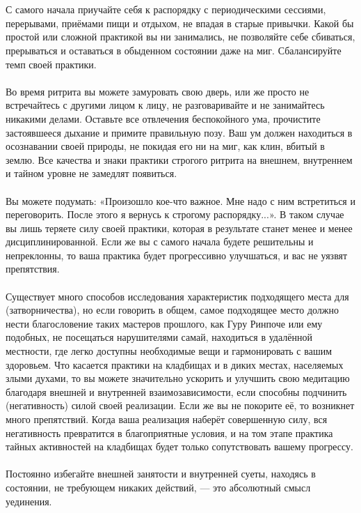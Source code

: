 \\ \\ С самого начала приучайте себя к распорядку с периодически\-ми сессиями, перерывами, приёмами пищи и отдыхом, не впадая в старые привычки. Какой бы простой или сложной практикой вы ни занимались, не позволяйте себе сбиваться, прерываться и оставаться в обыденном состоянии даже на миг. Сбалансируйте темп своей практики.
\\ \\ Во время ритрита вы можете замуровать свою дверь, или же просто не встречайтесь с другими лицом к лицу, не разговаривайте и не занимайтесь никакими делами. Оставьте все отвлечения беспокойного ума, прочистите застоявшееся дыхание и примите правильную позу. Ваш ум должен находиться в осознавании своей природы, не покидая его ни на миг, как клин, вбитый в землю. Все качества и знаки практики строгого ритрита на внешнем, внутреннем и тайном уровне не замедлят появиться.
\\ \\ Вы можете подумать: «Произошло кое-что важное. Мне надо с ним встретиться и переговорить. После этого я вернусь к строгому распорядку...». В таком случае вы лишь теряете силу своей практики, которая в результате станет менее и менее дисциплинированной. Если же вы с самого начала будете решительны и непреклонны, то ваша практика будет прогрессивно улучшаться, и вас не уязвят препятствия.
\\ \\ Существует много способов исследования характеристик подходящего места для (затворничества), но если говорить в общем, самое подходящее место должно нести благословение таких мастеров прошлого, как Гуру Ринпоче или ему подобных, не посещаться нарушителями самай, находиться в удалённой местности, где легко доступны необходимые вещи и гармонировать с вашим здоровьем. Что касается практики на кладбищах и в диких местах, населяемых злыми духами, то вы можете значительно ускорить и улучшить свою медитацию благодаря внешней и внутренней взаимозависимости, если способны подчинить (негативность) силой своей реализации. Если же вы не покорите её, то возникнет много препятствий. Когда ваша реализация наберёт совершенную силу, вся негативность превратится в благоприятные условия, и на том этапе практика тайных активностей на кладбищах будет только сопутствовать вашему прогрессу.
\\ \\ Постоянно избегайте внешней занятости и внутренней суеты, находясь в состоянии, не требующем никаких действий, — это абсолютный смысл уединения.
